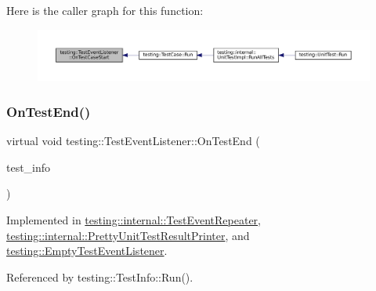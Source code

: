 Here is the caller graph for this function\+:
\nopagebreak
\begin{figure}[H]
\begin{center}
\leavevmode
\includegraphics[width=350pt]{classtesting_1_1TestEventListener_ab4ed885d63f5bbff8076c1329b3dfe36_icgraph}
\end{center}
\end{figure}
\mbox{\label{classtesting_1_1TestEventListener_abb1c44525ef038500608b5dc2f17099b}} 
\subsubsection{\texorpdfstring{On\+Test\+End()}{OnTestEnd()}}
{\footnotesize\ttfamily virtual void testing\+::\+Test\+Event\+Listener\+::\+On\+Test\+End (\begin{DoxyParamCaption}\item[{const \hyperlink{classtesting_1_1TestInfo}{Test\+Info} \&}]{test\+\_\+info }\end{DoxyParamCaption})\hspace{0.3cm}{\ttfamily [pure virtual]}}



Implemented in \hyperlink{classtesting_1_1internal_1_1TestEventRepeater_aa0f13bded9369aae1c78583d7276f8b1}{testing\+::internal\+::\+Test\+Event\+Repeater}, \hyperlink{classtesting_1_1internal_1_1PrettyUnitTestResultPrinter_a06749ff2b32a16c127374ecd015f13e0}{testing\+::internal\+::\+Pretty\+Unit\+Test\+Result\+Printer}, and \hyperlink{classtesting_1_1EmptyTestEventListener_afd58d21005f0d0d0399fb114627545d3}{testing\+::\+Empty\+Test\+Event\+Listener}.



Referenced by testing\+::\+Test\+Info\+::\+Run().

